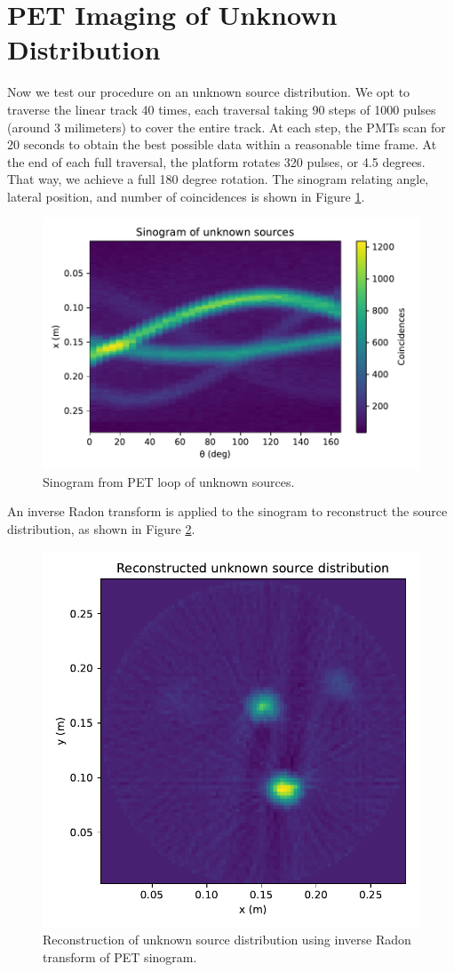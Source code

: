 \documentclass[12pt, letterpaper]{article}
\begin{document}
\section{PET Imaging of Unknown Distribution}\label{sec:unknown}

Now we test our procedure on an unknown source distribution. We opt to traverse the linear track 40 times, each traversal taking 90 steps of 1000 pulses (around 3 milimeters) to cover the entire track. At each step, the PMTs scan for 20 seconds to obtain the best possible data within a reasonable time frame. At the end of each full traversal, the platform rotates 320 pulses, or 4.5 degrees. That way, we achieve a full 180 degree rotation. The sinogram relating angle, lateral position, and number of coincidences is shown in Figure \ref{fig:unknown_sinogram}. 
\begin{figure}
    \centering
    \includegraphics[width=0.75\linewidth]{experiment5/figures/unknown_sinogram.pdf}
    \caption{Sinogram from PET loop of unknown sources. }
    \label{fig:unknown_sinogram}
\end{figure}
An inverse Radon transform is applied to the sinogram to reconstruct the source distribution, as shown in Figure \ref{fig:unknown_reconstruction}. 

\begin{figure}
    \centering
    \includegraphics[width=0.75\linewidth]{experiment5/figures/unknown_reconstruction.pdf}
    \caption{Reconstruction of unknown source distribution using inverse Radon transform of PET sinogram. }
    \label{fig:unknown_reconstruction}
\end{figure}
\end{document}
